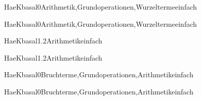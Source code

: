 \documentclass[12pt]{article}
\begin{document}
\begin{Add}{HaeK}{basal0}{Arithmetik,Grundoperationen,Wurzelterme}{einfach}
\solution{ }
\end{Add}
\begin{Add}{HaeK}{basal0}{Arithmetik,Grundoperationen,Wurzelterme}{einfach}
\end{Add}

\begin{Add}{HaeK}{basal1.2}{Arithmetik}{einfach}
\solution{ }
\end{Add}
\begin{Add}{HaeK}{basal1.2}{Arithmetik}{einfach}
\end{Add}

            \begin{Add}{HaeK}{basal0}{Bruchterme,Grundoperationen,Arithmetik}{einfach}
            \solution{ }
            \end{Add}
            \begin{Add}{HaeK}{basal0}{Bruchterme,Grundoperationen,Arithmetik}{einfach}
            \end{Add}
            
\end{document}
